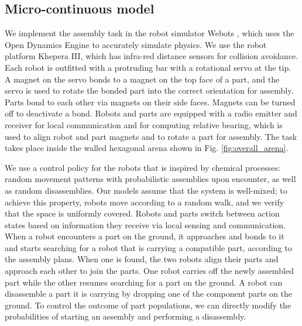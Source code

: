 
\subsection{Micro-continuous model} %
\label{sub:stochastic_assembly}

We implement the assembly task in the robot simulator Webots
\cite{Michel:2004p10762}, which uses the Open Dynamics Engine to
accurately simulate physics.  We use the robot platform Khepera III,
which has infra-red distance sensors for collision avoidance. Each
robot is outfitted with a protruding bar with a rotational servo at
the tip.  A magnet on the servo bonds to a magnet on the top face of
a part, and the servo is used to rotate the bonded part into the
correct orientation for assembly.  Parts bond to each other via
magnets on their side faces.  Magnets can be turned off to
deactivate a bond.  Robots and parts are equipped with a radio
emitter and receiver for local communication and for computing
relative bearing, which is used to align robot and part magnets and
to rotate a part for assembly. The task takes place inside the
walled hexagonal arena shown in Fig. \ref{fig:overall_arena}.

We use a control policy for the robots that is inspired by chemical
processes: random movement patterns with probabilistic assemblies
upon encounter, as well as random disassemblies.  Our models assume
that the system is well-mixed; to achieve this property, robots move
according to a random walk, and we verify that the space is
uniformly covered. Robots and parts switch between action states
based on information they receive via local sensing and
communication.  When a robot encounters a part on the ground, it
approaches and bonds to it and starts searching for a robot that is
carrying a compatible part, according to the assembly plans.  When
one is found, the two robots align their parts and approach each
other to join the parts.  One robot carries off the newly assembled
part while the other resumes searching for a part on the ground. A
robot can disassemble a part it is carrying by dropping one of the
component parts on the ground.  To control the outcome of part
populations, we can directly modify the probabilities of starting an
assembly and performing a disassembly.


